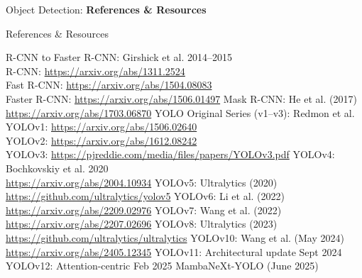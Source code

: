 \begin{frame}{}
    \LARGE Object Detection: \textbf{References \& Resources}
\end{frame}

\begin{frame}[allowframebreaks]{References \& Resources}
    \begin{thebibliography}{99}
            R-CNN to Faster R-CNN: Girshick et al. 2014–2015 \\
            R-CNN: \url{https://arxiv.org/abs/1311.2524} \\
            Fast R-CNN: \url{https://arxiv.org/abs/1504.08083} \\
            Faster R-CNN: \url{https://arxiv.org/abs/1506.01497}
            Mask R-CNN: He et al. (2017) \\
            \url{https://arxiv.org/abs/1703.06870}
            YOLO Original Series (v1–v3): Redmon et al. \\
            YOLOv1: \url{https://arxiv.org/abs/1506.02640} \\
            YOLOv2: \url{https://arxiv.org/abs/1612.08242} \\
            YOLOv3: \url{https://pjreddie.com/media/files/papers/YOLOv3.pdf}
            YOLOv4: Bochkovskiy et al. 2020 \\
            \url{https://arxiv.org/abs/2004.10934}
            YOLOv5: Ultralytics (2020) \\
            \url{https://github.com/ultralytics/yolov5}
            YOLOv6: Li et al. (2022) \\
            \url{https://arxiv.org/abs/2209.02976}
            YOLOv7: Wang et al. (2022) \\
            \url{https://arxiv.org/abs/2207.02696}
            YOLOv8: Ultralytics (2023) \\
            \url{https://github.com/ultralytics/ultralytics}
            YOLOv10: Wang et al. (May 2024) \\
            \url{https://arxiv.org/abs/2405.12345} %
            YOLOv11: Architectural update Sept 2024
            YOLOv12: Attention-centric Feb 2025
            MambaNeXt-YOLO (June 2025)

\end{thebibliography}
\end{frame}
